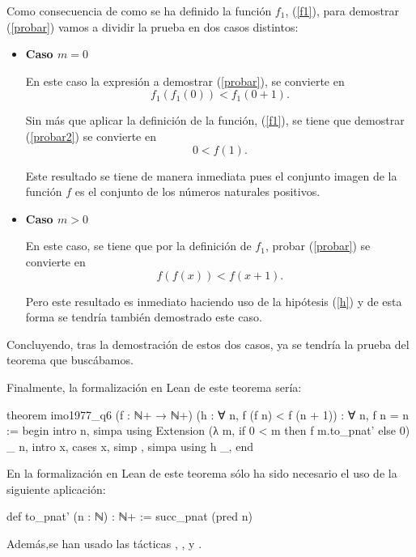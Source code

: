 \begin{demostracion}
  Como consecuencia de como se ha definido la función \(f_1\), (\ref{f1}),
  para demostrar (\ref{probar}) vamos a dividir la prueba en dos casos
  distintos:
  \begin{itemize}
  \item \textbf{Caso \(m=0\)}

    En este caso la expresión a demostrar (\ref{probar}), se convierte en
    \begin{equation}\label{probar2}
      f_1(f_1(0)) < f_1(0+1).
    \end{equation}

    Sin más que aplicar la definición de la función, (\ref{f1}), se tiene
    que demostrar (\ref{probar2}) se convierte en
    \begin{equation}
      0 < f(1).
    \end{equation}

    Este resultado se tiene de manera inmediata pues el conjunto imagen
    de la función \(f\) es el conjunto de los números naturales positivos.

  \item \textbf{Caso \(m>0\)}

    En este caso, se tiene que por la definición de \(f_1\), probar
    (\ref{probar}) se convierte en
    \begin{equation}\label{probar3}
    f(f(x)) < f(x+1).
    \end{equation}

    Pero este resultado es inmediato haciendo uso de la hipótesis
    (\ref{h}) y de esta forma se tendría también demostrado este caso.
  \end{itemize}

  Concluyendo, tras la demostración de estos dos casos, ya se tendría
  la prueba del teorema que buscábamos.
\end{demostracion}

Finalmente, la formalización en Lean de este teorema sería:
\begin{leancode}
theorem imo1977_q6
  (f : ℕ+ → ℕ+)
  (h : ∀ n, f (f n) < f (n + 1))
  : ∀ n, f n = n :=
begin
  intro n,
  simpa using Extension (λ m, if 0 < m then f m.to_pnat' else 0) _ n,
  intro x,
  cases x,
  { simp },
  { simpa using h _},
end
\end{leancode}

En la formalización en Lean de este teorema sólo ha sido necesario el uso
de la siguiente aplicación:
\begin{leancode}
def to_pnat' (n : ℕ) : ℕ+ := succ_pnat (pred n)
\end{leancode}
Además,se han usado las tácticas
,
,
 y
.

